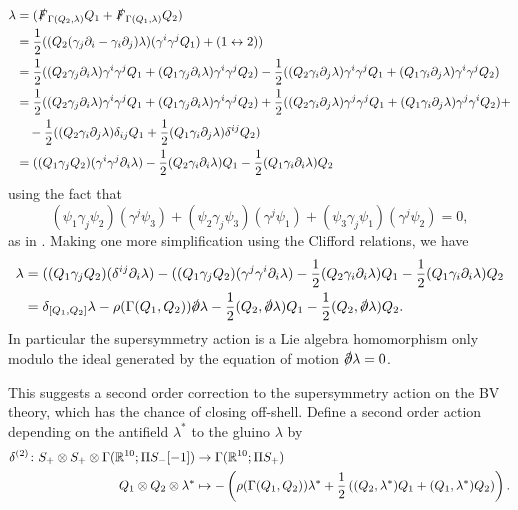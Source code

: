 \documentclass[10pt, oneside]{article}
\begin{document}
\begin{align*}
[\delta_{Q_1}, \delta_{Q_2}] \lambda &= (\sd F_{\Gamma(Q_2, \lambda)} Q_1 + \sd F_{\Gamma(Q_1,\lambda)} Q_2) \\
&= \frac 12((Q_2 (\gamma_j \dd_i - \gamma_i \dd_j) \lambda) (\gamma^i \gamma^j Q_1) + (1 \leftrightarrow 2)) \\
&= \frac 12((Q_2 \gamma_j \dd_i \lambda) \gamma^i \gamma^j Q_1 + (Q_1 \gamma_j \dd_i \lambda) \gamma^i \gamma^j Q_2) - \frac 12((Q_2 \gamma_i \dd_j \lambda) \gamma^i \gamma^j Q_1 + (Q_1 \gamma_i \dd_j \lambda) \gamma^i \gamma^j Q_2) \\
&= \frac 12((Q_2 \gamma_j \dd_i \lambda) \gamma^i \gamma^j Q_1 + (Q_1 \gamma_j \dd_i \lambda) \gamma^i \gamma^j Q_2) + \frac 12((Q_2 \gamma_i \dd_j \lambda) \gamma^j \gamma^j Q_1 + (Q_1 \gamma_i \dd_j \lambda) \gamma^j \gamma^i Q_2) + \\
&\quad - \frac 12((Q_2 \gamma_i \dd_j \lambda) \delta_{ij} Q_1 + \frac 12(Q_1 \gamma_i \dd_j \lambda) \delta^{ij} Q_2) \\
&= ((Q_1 \gamma_j Q_2) (\gamma^i \gamma^j \dd_i \lambda) - \frac 12(Q_2 \gamma_i \dd_i \lambda)Q_1 - \frac 12(Q_1 \gamma_i \dd_i \lambda)Q_2
\end{align*}
using the fact that 
\[(\psi_1 \gamma_j \psi_2)(\gamma^j \psi_3) + (\psi_2 \gamma_j \psi_3)(\gamma^j \psi_1) + (\psi_3 \gamma_j \psi_1)(\gamma^j \psi_2) = 0,\]
as in \cite[Theorem 11]{BaezHuerta}.  Making one more simplification using the Clifford relations, we have
\begin{align*}
[\delta_{Q_1}, \delta_{Q_2}] \lambda &= ((Q_1 \gamma_j Q_2) (\delta^{ij} \dd_i \lambda) - ((Q_1 \gamma_j Q_2) (\gamma^j \gamma^i \dd_i \lambda) - \frac 12(Q_2 \gamma_i \dd_i \lambda)Q_1 - \frac 12(Q_1 \gamma_i \dd_i \lambda)Q_2 \\
&= \delta_{[Q_1,Q_2]} \lambda - \rho(\Gamma(Q_1,Q_2)) \sd \dd \lambda - \frac 12(Q_2, \sd \dd \lambda)Q_1 - \frac 12(Q_2, \sd \dd \lambda)Q_2.
\end{align*}
In particular the supersymmetry action is a Lie algebra homomorphism only modulo the ideal generated by the equation of motion $\sd \dd \lambda = 0$.

\begin{remark}
This suggests a second order correction to the supersymmetry action on the BV theory, which has the chance of closing off-shell.  Define a second order action depending on the antifield $\lambda^*$ to the gluino $\lambda$ by
\begin{align*}
\delta^{(2)} \colon S_+ \otimes S_+ \otimes \Gamma(\mathbb{R}^{10}; \Pi S_-[-1]) &\to \Gamma(\mathbb{R}^{10}; \Pi S_+) \\
Q_1 \otimes Q_2 \otimes \lambda^* &\mapsto - \left(\rho(\Gamma(Q_1,Q_2)) \lambda^* + \frac 12 \left((Q_2, \lambda^*)Q_1 + (Q_1, \lambda^*)Q_2\right)\right).
\end{align*}
\end{remark}
\end{document}
